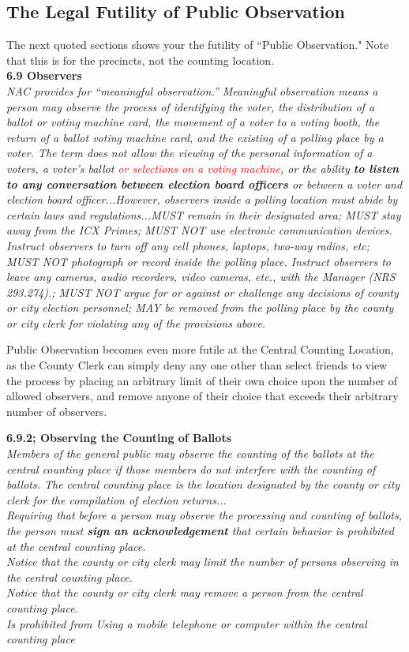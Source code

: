 \documentclass[preprint,13pt]{elsarticle}
\begin{document}
\subsection{The Legal Futility of Public Observation}
The next quoted sections shows your the futility of ``Public Observation." Note that this is for the precincts, not the counting location.\\
\textbf{6.9 Observers}\\
\textit{NAC provides for “meaningful observation.” Meaningful observation means a person may observe the process
of identifying the voter, the distribution of a ballot or voting machine card, the movement of a voter to a
voting booth, the return of a ballot voting machine card, and the existing of a polling place by a voter. The
term does not allow the viewing of the personal information of a voters, a voter’s ballot \textcolor{red}{or selections on a voting machine}, or the ability \textbf{to listen to any conversation between election board officers} or between a voter and election board officer...However, observers inside a polling location must abide by certain laws and regulations...MUST remain in their designated area; MUST stay away from the ICX Primes; MUST NOT use electronic communication devices. Instruct observers to turn off any cell phones, laptops, two-way radios, etc; MUST NOT photograph or record inside the polling place. Instruct observers to leave any cameras, audio recorders, video cameras, etc., with the Manager (NRS 293.274).; MUST NOT argue for or against or challenge any decisions of county or city election personnel; MAY be removed from the polling place by the county or city clerk for violating any of the provisions above.}

Public Observation becomes even more futile at the Central Counting Location, as the County Clerk can simply deny any one other than select friends to view the process by placing an arbitrary limit of their own choice upon the number of allowed observers, and remove anyone of their choice that exceeds their arbitrary number of observers.

\textbf{6.9.2; Observing the Counting of Ballots}\\
\textit{Members of the general public may observe the counting of the ballots at the central counting place if those members do not interfere with the counting of ballots. The central counting place is the location designated
by the county or city clerk for the compilation of election returns...\\
Requiring that before a person may observe the processing and counting of ballots, the person must
\textbf{sign an acknowledgement} that certain behavior is prohibited at the central counting place.\\
Notice that the county or city clerk may limit the number of persons observing in the central counting
place.\\
Notice that the county or city clerk may remove a person from the central counting place.\\
Is prohibited from Using a mobile telephone or computer within the central counting place\\}
\end{document}

